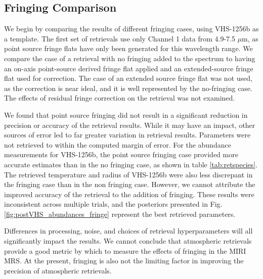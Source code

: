 \subsection{Fringing Comparison}
We begin by comparing the results of different fringing cases, using VHS-1256b as a template.
The first set of retrievals use only Channel 1 data from 4.9-7.5 $\mu$m, as point source fringe flats have only been generated for this wavelength range.
We compare the case of a retrieval with no fringing added to the spectrum to having an on-axis point-source derived fringe flat applied and an extended-source fringe flat used for correction.
The case of an extended source fringe flat was not used, as the correction is near ideal, and it is well represented by the no-fringing case.
The effects of residual fringe correction on the retrieval was not examined.

We found that point source fringing did not result in a significant reduction in precision or accuracy of the retrieval results.
While it may have an impact, other sources of error led to far greater variation in retrieval results.
Parameters were not retrieved to within the computed margin of error.
For the abundance measurements for VHS-1256b, the point source fringing case provided more accurate estimates than in the no fringing case, as shown in table \ref{tab:retspecies}.
The retrieved temperature and radius of VHS-1256b were also less discrepant in the fringing case than in the non fringing case.
However, we cannot attribute the improved accuracy of the retrieval to the addition of fringing.
These results were inconsistent across multiple trials, and the posteriors presented in Fig. \ref{fig:postVHS_abundances_fringe} represent the best retrieved parameters. 

Differences in processing, noise, and choices of retrieval hyperparameters will all significantly impact the results.
We cannot conclude that atmospheric retrievals provide a good metric by which to measure the effects of fringing in the MIRI MRS.
At the present, fringing is also not the limiting factor in improving the precision of atmospheric retrievals.

